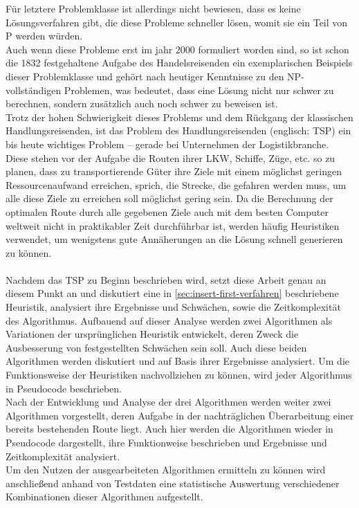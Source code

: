 Für letztere Problemklasse ist allerdings nicht bewiesen, dass es keine Lösungsverfahren gibt, die diese Probleme schneller lösen, womit sie ein Teil von P werden würden.
\\
Auch wenn diese Probleme erst im jahr 2000 formuliert worden sind, so ist schon die 1832 festgehaltene Aufgabe des Handelsreisenden ein exemplarischen Beispiels dieser Problemklasse und gehört nach heutiger Kenntnisse zu den NP-vollständigen Problemen, was bedeutet, dass eine Lösung nicht nur schwer zu berechnen, sondern zusätzlich auch noch schwer zu beweisen ist.
\\
Trotz der hohen Schwierigkeit dieses Problems und dem Rückgang der klassischen Handlungsreisenden, ist das Problem des Handlungsreisenden (englisch: \acf{TSP}) ein bis heute wichtiges Problem -- gerade bei Unternehmen der Logistikbranche.
Diese stehen vor der Aufgabe die Routen ihrer LKW, Schiffe, Züge, etc. so zu planen, dass zu transportierende Güter ihre Ziele mit einem möglichst geringen Ressourcenaufwand erreichen, sprich, die Strecke, die gefahren werden muss, um alle diese Ziele zu erreichen soll möglichst gering sein.
Da die Berechnung der optimalen Route durch alle gegebenen Ziele auch mit dem besten Computer weltweit nicht in praktikabler Zeit durchführbar ist, werden häufig Heuristiken verwendet, um wenigstens gute Annäherungen an die Lösung schnell generieren zu können.
\\\\
Nachdem das \ac{TSP} zu Beginn beschrieben wird, setzt diese Arbeit genau an diesem Punkt an und diskutiert eine in \vref{sec:insert-first-verfahren} beschriebene Heuristik, analysiert ihre Ergebnisse und Schwächen, sowie die Zeitkomplexität des Algorithmus. 
Aufbauend auf dieser Analyse werden zwei Algorithmen als Variationen der ursprünglichen Heuristik entwickelt, deren Zweck die Ausbesserung von festgestellten Schwächen sein soll.
Auch diese beiden Algorithmen werden diskutiert und auf Basis ihrer Ergebnisse analysiert.
Um die Funktionsweise der Heuristiken nachvollziehen zu können, wird jeder Algorithmus in Pseudocode beschrieben.
\\
Nach der Entwicklung und Analyse der drei Algorithmen werden weiter zwei Algorithmen vorgestellt, deren Aufgabe in der nachträglichen Überarbeitung einer bereits bestehenden Route liegt.
Auch hier werden die Algorithmen wieder in Pseudocode dargestellt, ihre Funktionweise beschrieben und Ergebnisse und Zeitkomplexität analysiert.
\\
Um den Nutzen der ausgearbeiteten Algorithmen ermitteln zu können wird anschließend anhand von Testdaten eine statistische Auswertung verschiedener Kombinationen dieser Algorithmen aufgestellt.
